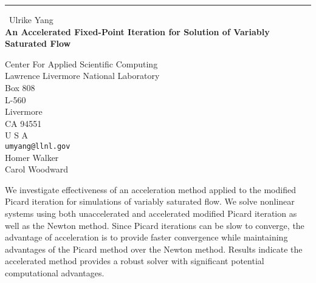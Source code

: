 \documentclass{report}
\begin{document}
\begin{center}
\rule{6in}{1pt} \
{\large Ulrike Yang \\
{\bf An Accelerated Fixed-Point Iteration for Solution of Variably Saturated Flow}}

Center For Applied Scientific Computing \\ Lawrence Livermore National Laboratory \\ Box 808 \\ L-560 \\ Livermore \\ CA 94551 \\ U S A
\\
{\tt umyang@llnl.gov}\\
Homer Walker\\
Carol Woodward\end{center}

We investigate effectiveness of an acceleration method applied
to the modified Picard iteration for simulations of variably saturated
flow. We solve nonlinear systems using both unaccelerated and accelerated
modified Picard iteration as well as the Newton method. Since Picard
iterations can be slow to
converge, the advantage of acceleration is to provide faster
convergence while maintaining advantages of the Picard method over the
Newton method. Results indicate the accelerated method provides a robust
solver with significant potential computational advantages.
\end{document}
